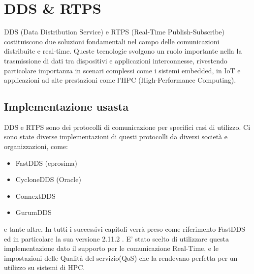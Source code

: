 \chapter{DDS \& RTPS}\label{Chapter:dds}
DDS (Data Distribution Service)\cite{DDS} e RTPS (Real-Time Publish-Subscribe)\cite{RTPS} costituiscono due soluzioni fondamentali nel campo delle comunicazioni distribuite e real-time. Queste tecnologie svolgono un ruolo importante nella la trasmissione di dati tra dispositivi e applicazioni interconnesse, rivestendo particolare importanza in scenari complessi come i sistemi embedded, in IoT e applicazioni ad alte prestazioni come l'HPC (High-Performance Computing). 


\section{Implementazione usasta}
DDS e RTPS sono dei protocolli di comunicazione per specifici casi di utilizzo. Ci sono state diverse implementazioni di questi protocolli da diversi società e organizzazioni, come:
\begin{itemize}
  \item FastDDS (eprosima)
  \item CycloneDDS (Oracle)
  \item ConnextDDS
  \item GurumDDS
\end{itemize}

e tante altre. In tutti i successivi capitoli verrà preso come riferimento FastDDS ed in particolare la sua versione 2.11.2 \cite{FastDDS}. E' stato scelto di utilizzare questa implementazione  dato il supporto per le comunicazione Real-Time, e le impostazioni delle Qualità del servizio(QoS) che la rendevano perfetta per un utilizzo su sistemi di HPC. %

